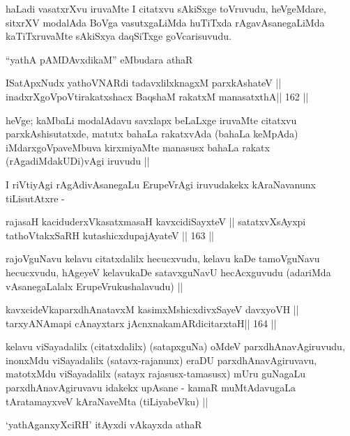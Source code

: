 \begin{artha}
haLadi vasatxrXvu iruvaMte I citatxvu sAkiSxge toVruvudu, heVgeMdare,
sitxrXV modalAda BoVga vasutxgaLiMda huTiTxda rAgavAsanegaLiMda
kaTiTxruvaMte sAkiSxya daqSiTxge goVcarisuvudu.

``yathA pAMDAvxdikaM'' eMbudara athaR 
\end{artha}

\begin{shl}
ISatApxNudx yathoVNARdi tadavxlilxknagxM parxkAshateV ||
inadxrXgoVpoV\s tirakatxshacx BaqshaM rakatxM manasatxthA\hfill || 162 ||
\end{shl}

\begin{artha}
heVge; kaMbaLi modalAdavu savxlapx beLaLxge iruvaMte citatxvu
parxkAshisutatxde, matutx bahaLa rakatxvAda (bahaLa keMpAda)
iMdarxgoVpaveMbuva kirxmiyaMte manasusx bahaLa rakatx
(rAgadiMdakUDi)vAgi iruvudu ||
\end{artha}

\begin{artha}
I riVtiyAgi rAgAdivAsanegaLu ErupeVrAgi iruvudakekx kAraNavanunx
tiLisutAtxre -
\end{artha}

\begin{shl}
rajasaH kaciduderxVkasatxmasaH kavxcidiSayxteV ||
satatxvXsAyxpi tathoVtakxSaRH kutashicxdupajAyateV ||  163 ||
\end{shl}

\begin{artha}
rajoVguNavu kelavu citatxdalilx hecucxvudu, kelavu kaDe tamoVguNavu
hecucxvudu, hAgeyeV kelavukaDe satavxguNavU hecAcxguvudu (adariMda
vAsanegaLalalx ErupeVrukushalavudu) ||
\end{artha}

\begin{shl}
kavxcideVkaparxdhAnatavxM kasimxMshicxdivxSayeV davxyoVH ||
tarxyANAmapi cAnayxtarx jAcnxnakamARdicitarxtaH\hfill || 164 ||
\end{shl}

\begin{artha}
kelavu viSayadalilx (citatxdalilx) (satapxguNa) oMdeV
parxdhAnavAgiruvudu, inonxMdu viSayadalilx (satavx-rajanunx) eraDU
parxdhAnavAgiruvavu, matotxMdu viSayadalilx (satayx rajasusx-tamasusx)
mUru guNagaLu parxdhAnavAgiruvavu idakekx upAsane - kamaR
muMtAdavugaLa tAratamayxveV kAraNaveMta (tiLiyabeVku) ||

`yathA\s ganxyXciRH' itAyxdi vAkayxda athaR
\end{artha}

